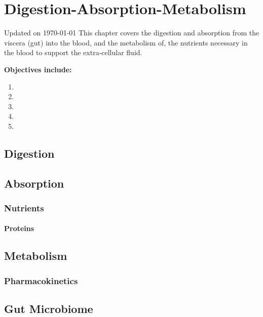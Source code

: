 \chapter{Digestion-Absorption-Metabolism}\label{chp:blood_nutrients}
Updated on \today
\minitoc
This chapter covers the digestion and absorption from the viscera (gut) into the blood, and the metabolism of, the nutrients necessary in the blood to support the extra-cellular fluid. 

\vspace{5mm}

\textbf{Objectives include:}
\begin{enumerate}
    \item
    \item
    \item
    \item
    \item
\end{enumerate}

\section{Digestion}

\section{Absorption}

\subsection{Nutrients}

\subsubsection{Proteins}


\section{Metabolism}
\subsection{Pharmacokinetics}


\section{Gut Microbiome}



